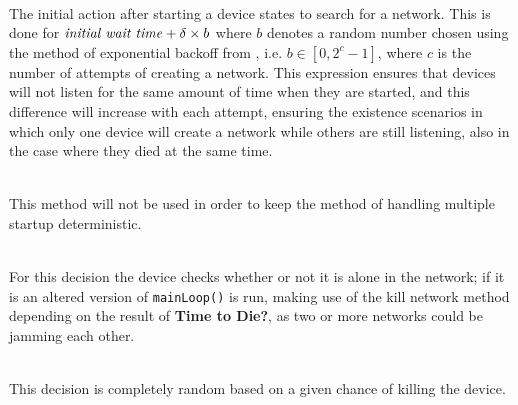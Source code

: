 \begin{description}[labelindent=\parindent]
    \item[Search for network]\hfill\\
    The initial action after starting a device states to search for a network.
    This is done for $\text{\textit{initial wait time}} + \delta \times b$ where $b$ denotes a random number chosen using the method of exponential backoff from , i.e. $b \in [0, 2^c-1]$, where $c$ is the number of attempts of creating a network.
    This expression ensures that devices will not listen for the same amount of time when they are started, and this difference will increase with each attempt, ensuring the existence scenarios in which only one device will create a network while others are still listening, also in the case where they died at the same time.
    \item[Chance of creating a network]\hfill\\
    This method will not be used in order to keep the method of handling multiple startup deterministic.
    \item[Alone in network?]\hfill\\
    For this decision the device checks whether or not it is alone in the network; if it is an altered version of \texttt{mainLoop()} is run, making use of the kill network method depending on the result of \textbf{Time to Die?}, as two or more networks could be jamming each other.
    \item[Time to Die?]\hfill\\
    This decision is completely random based on a given chance of killing the device.
\end{description}


